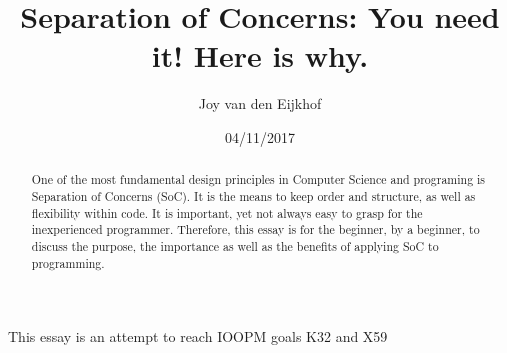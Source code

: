 \documentclass[11pt,a4paper]{article}
\title{Separation of Concerns: 
You need it! Here is why.}
\author{Joy van den Eijkhof}
\date{04/11/2017}
\begin{document}
\maketitle
\noindent
\begin{abstract}
One of the most fundamental design principles in Computer Science and programing is Separation of Concerns (SoC). It is the means to keep order and structure, as well as flexibility within code. It is important, yet not always easy to grasp for the inexperienced programmer. Therefore, this essay is for the beginner, by a beginner, to discuss the purpose, the importance as well as the benefits of applying SoC to programming.\linebreak  \linebreak \linebreak
\end{abstract}

\begin{center}
 This essay is an attempt to reach IOOPM goals K32 and X59
\end{center}
\end{document}
